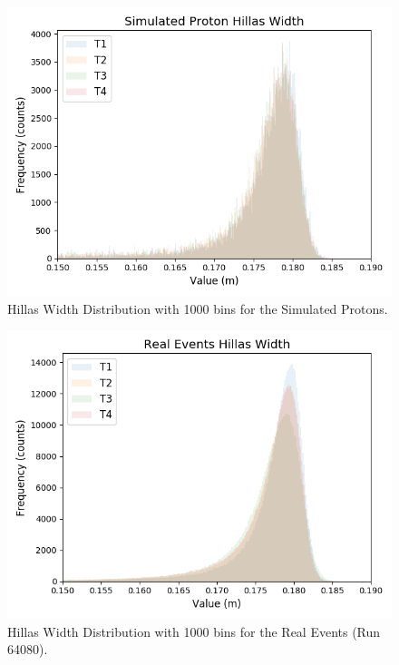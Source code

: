 \begin{figure}[ht] 
        \centering \includegraphics[width=\columnwidth]{figures/Proton2_int.png}

        \caption{
                \label{fig:Proton2_int} Hillas Width Distribution with 1000 bins for the Simulated Protons.
        }
\end{figure}

\begin{figure}[ht] 
        \centering \includegraphics[width=\columnwidth]{figures/Real_int.png}

        \caption{
                \label{fig:Real_int} Hillas Width Distribution with 1000 bins for the Real Events (Run 64080). 
        }
\end{figure}

